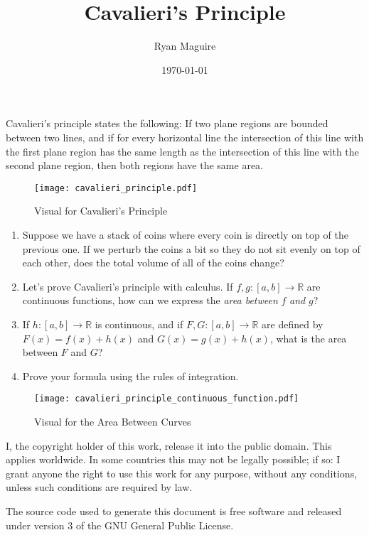 \documentclass{article}
\title{Cavalieri's Principle}
\author{Ryan Maguire}
\date{\today}
\begin{document}
    \maketitle
    Cavalieri's principle states the following:
    If two plane regions are bounded between two lines, and if for every
    horizontal line the intersection of this line with the first plane
    region has the same length as the intersection of this line with the
    second plane region, then both regions have the same area.
    \begin{figure}
        \centering
        \texttt{[image: cavalieri\_principle.pdf]}
        \caption{Visual for Cavalieri's Principle}
    \end{figure}
    \begin{enumerate}
        \item
        Suppose we have a stack of coins where every coin is directly on top of
        the previous one. If we perturb the coins a bit so they do not sit
        evenly on top of each other, does the total volume of all of the coins
        change?
        \item
        Let's prove Cavalieri's principle with calculus. If
        $f,g:[a,b]\rightarrow\mathbb{R}$ are continuous functions, how can we
        express the \textit{area between} $f$ \textit{and} $g$?
        \item
        If $h:[a,b]\rightarrow\mathbb{R}$ is continuous, and if
        $F,G:[a,b]\rightarrow\mathbb{R}$ are defined by
        $F(x)=f(x)+h(x)$ and $G(x)=g(x)+h(x)$, what is the area between $F$
        and $G$?
        \item
        Prove your formula using the rules of integration.
    \end{enumerate}
    \begin{figure}
        \centering
        \texttt{[image: cavalieri\_principle\_continuous\_function.pdf]}
        \caption{Visual for the Area Between Curves}
    \end{figure}
    \newpage
    I, the copyright holder of this work, release it into the public domain.
    This applies worldwide. In some countries this may not be legally possible;
    if so: I grant anyone the right to use this work for any purpose, without
    any conditions, unless such conditions are required by law.
    \par\hfill\par
    The source code used to generate this document is free software and released
    under version 3 of the GNU General Public License.
\end{document}
